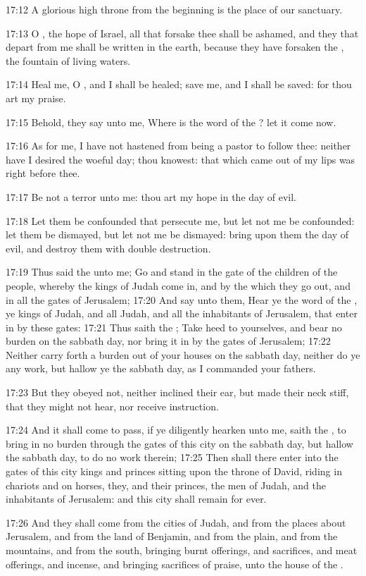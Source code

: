 17:12 A glorious high throne from the beginning is the place of our
sanctuary.

17:13 O \LORD, the hope of Israel, all that forsake thee shall be
ashamed, and they that depart from me shall be written in the earth,
because they have forsaken the \LORD, the fountain of living waters.

17:14 Heal me, O \LORD, and I shall be healed; save me, and I shall be
saved: for thou art my praise.

17:15 Behold, they say unto me, Where is the word of the \LORD? let it
come now.

17:16 As for me, I have not hastened from being a pastor to follow
thee: neither have I desired the woeful day; thou knowest: that which
came out of my lips was right before thee.

17:17 Be not a terror unto me: thou art my hope in the day of evil.

17:18 Let them be confounded that persecute me, but let not me be
confounded: let them be dismayed, but let not me be dismayed: bring
upon them the day of evil, and destroy them with double destruction.

17:19 Thus said the \LORD unto me; Go and stand in the gate of the
children of the people, whereby the kings of Judah come in, and by the
which they go out, and in all the gates of Jerusalem; 17:20 And say
unto them, Hear ye the word of the \LORD, ye kings of Judah, and all
Judah, and all the inhabitants of Jerusalem, that enter in by these
gates: 17:21 Thus saith the \LORD; Take heed to yourselves, and bear no
burden on the sabbath day, nor bring it in by the gates of Jerusalem;
17:22 Neither carry forth a burden out of your houses on the sabbath
day, neither do ye any work, but hallow ye the sabbath day, as I
commanded your fathers.

17:23 But they obeyed not, neither inclined their ear, but made their
neck stiff, that they might not hear, nor receive instruction.

17:24 And it shall come to pass, if ye diligently hearken unto me,
saith the \LORD, to bring in no burden through the gates of this city
on the sabbath day, but hallow the sabbath day, to do no work therein;
17:25 Then shall there enter into the gates of this city kings and
princes sitting upon the throne of David, riding in chariots and on
horses, they, and their princes, the men of Judah, and the inhabitants
of Jerusalem: and this city shall remain for ever.

17:26 And they shall come from the cities of Judah, and from the
places about Jerusalem, and from the land of Benjamin, and from the
plain, and from the mountains, and from the south, bringing burnt
offerings, and sacrifices, and meat offerings, and incense, and
bringing sacrifices of praise, unto the house of the \LORD.

